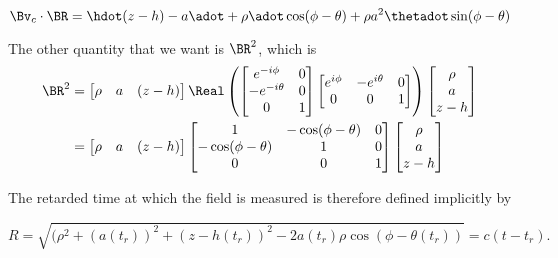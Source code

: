 {\begin{equation}\label{eqn:relativisticElectrodynamicsExamReflection:880}
\Bv_c \cdot \BR = \hdot (z - h) -a \adot + \rho \adot \cos(\phi- \theta) + \rho a^2 \thetadot \sin(\phi - \theta)
\end{equation}

The other quantity that we want is $\BR^2$, which is
\begin{equation}\label{eqn:relativisticElectrodynamicsExamReflection:1270}
\begin{aligned}
\BR^2 &= 
\begin{bmatrix}
\rho &
a &
(z - h)
\end{bmatrix}
\Real \left(
\begin{bmatrix}
e^{-i\phi}  & 0 \\
-e^{-i\theta}  & 0 \\
0 & 1
\end{bmatrix}
\begin{bmatrix}
e^{i\phi} & -e^{i\theta} & 0 \\
0 & 0 & 1
\end{bmatrix}
\right)
\begin{bmatrix}
\rho \\
a \\
z - h
\end{bmatrix} \\
&=
\begin{bmatrix}
\rho &
a &
(z - h)
\end{bmatrix}
\begin{bmatrix}
1 & -\cos(\phi-\theta) & 0 \\
-\cos(\phi-\theta) & 1 & 0 \\
0 & 0 & 1
\end{bmatrix} 
\begin{bmatrix}
\rho \\
a \\
z - h
\end{bmatrix} \\
\end{aligned}
\end{equation}

The retarded time at which the field is measured is therefore defined implicitly by

\begin{equation}\label{eqn:relativisticElectrodynamicsExamReflection:900}
R = \sqrt{(\rho^2 + (a(t_r))^2 + (z-h(t_r))^2 - 2 a(t_r) \rho \cos(\phi - \theta(t_r))} = c( t - t_r).
\end{equation}

}
